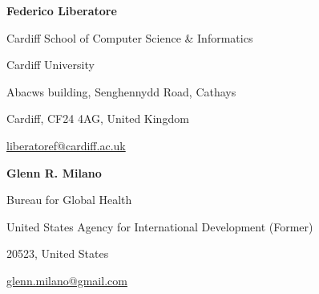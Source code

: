 \noindent\begin{minipage}{\linewidth}
\textbf{Federico Liberatore}\par
Cardiff School of Computer Science \& Informatics\par
Cardiff University\par
Abacws building, Senghennydd Road, Cathays\par
Cardiff, CF24 4AG, United Kingdom\par
\href{mailto:liberatoref@cardiff.ac.uk}{liberatoref@cardiff.ac.uk}\par
\end{minipage}\par\vspace{1em}

\noindent\begin{minipage}{\linewidth}
\textbf{Glenn R. Milano}\par
Bureau for Global Health\par
United States Agency for International Development (Former)\par
20523, United States\par
\href{mailto:glenn.milano@gmail.com}{glenn.milano@gmail.com}\par
\end{minipage}\par
\endgroup
\clearpage
